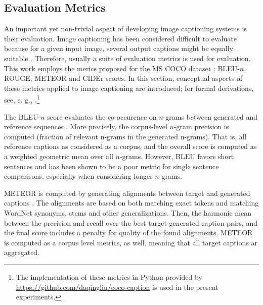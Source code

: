 \subsection{Evaluation Metrics}
An important yet non-trivial aspect of developing image captioning systems is their evaluation. Image captioning has been considered difficult to evaluate because for a given input image, several output captions might be equally suitable . Therefore, usually a suite of evaluation metrics is used for evaluation. This work employs the merics proposed for the MS COCO dataset \parencite{chen2015microsoft}: BLEU-$n$, ROUGE, METEOR and CIDEr scores. In this section, conceptual aspects of these metrics applied to image captioning are introduced; for formal derivations, see, e. g., \cite{chen2015microsoft}.\footnote{The implementation of these metrics in Python provided by \url{https://github.com/daqingliu/coco-caption} is used in the present experiments.}

The BLEU-$n$ score evaluates the co-occurence on $n$-grams between generated and reference sequences \parencite{papineni2002bleu}. More precisely, the corpus-level $n$-gram precision is computed (fraction of relevant n-grams in the generated n-grams). That is, all reference captions as considered as a corpus, and the overall score is computed as a weighted geometric mean over all $n$-grams. However, BLEU favors short sentences and has been shown to be a poor metric for single sentence comparisons, especially when considering longer $n$-grams. 


METEOR is computed by generating alignments between target and generated captions \parencite{banerjee2005meteor}. The alignments are based on both matching exact tokens and matching WordNet synonyms, stems and other generalizations. Then, the harmonic mean between the precision and recall over the best target-generated caption pairs, and the final score includes a penalty for quality of the found alignments. METEOR is computed as a corpus level metrics, as well, meaning that all target captions ar aggregated.
 
